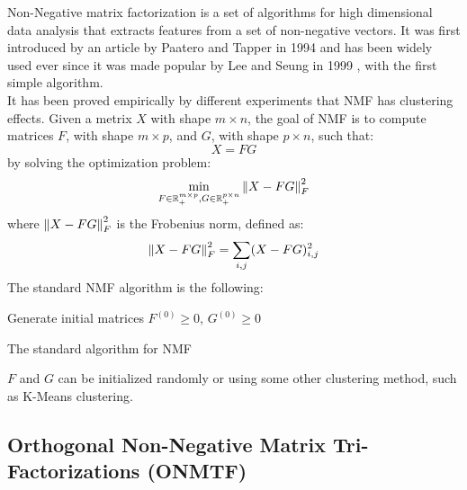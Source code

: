 Non-Negative matrix factorization is a set of algorithms for high dimensional data analysis that extracts features from a set of non-negative vectors. It was first introduced by an article by Paatero and Tapper in 1994 \cite{10.1002/env.3170050203} and has been widely used ever since it was made popular by Lee and Seung in 1999 \cite{10.1038/44565}, with the first simple algorithm.\\
It has been proved empirically by different experiments \cite{10.5555/1005332.1044709, 10.1109/CVPR.2001.990477} that NMF has clustering effects.
Given a metrix $X$ with shape $m \times n$, the goal of NMF is to compute matrices $F$, with shape $m \times p$, and $G$, with shape $p \times n$, such that:
\begin{equation*}
X = FG
\end{equation*}
by solving the optimization problem:
\begin{equation*}
\min_{F \in \mathbb{R}^{m \times p}_+, G \in \mathbb{R}^{p \times n}_+} \left\lVert X - FG\right\rVert^2_F
\end{equation*}
where $\left\lVert X - FG\right\rVert^2_F$ is the Frobenius norm, defined as:
\begin{equation*}
\left\lVert X - FG\right\rVert^2_F = \sum_{i,j} (X - FG)^2_{i,j}
\end{equation*}
The standard NMF algorithm is the following:
\vskip 0.7cm
\begin{algorithm}[H]
Generate initial matrices $F^{(0)} \geq 0$, $G^{(0)} \geq 0$\;
\caption{The standard algorithm for NMF}
\end{algorithm}
\vskip 0.7cm
$F$ and $G$ can be initialized randomly or using some other clustering method, such as K-Means clustering.


\subsection{Orthogonal Non-Negative Matrix Tri-Factorizations (ONMTF)}

